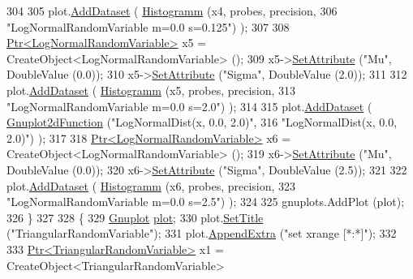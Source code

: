 \begin{DoxyCode}
304 
305     plot.\hyperlink{classns3_1_1Gnuplot_a306ec724a327cf9ab699700f31fca0a1}{AddDataset} ( \hyperlink{main-random-variable_8cc_a2cfd3837ab3f2e816cf53486d7a186b5}{Histogramm} (x4, probes, precision,
306                                   \textcolor{stringliteral}{"LogNormalRandomVariable m=0.0 s=0.125"}) );
307 
308     \hyperlink{classns3_1_1Ptr}{Ptr<LogNormalRandomVariable>} x5 = CreateObject<LogNormalRandomVariable> ();
309     x5->\hyperlink{classns3_1_1ObjectBase_ac60245d3ea4123bbc9b1d391f1f6592f}{SetAttribute} (\textcolor{stringliteral}{"Mu"}, DoubleValue (0.0));
310     x5->\hyperlink{classns3_1_1ObjectBase_ac60245d3ea4123bbc9b1d391f1f6592f}{SetAttribute} (\textcolor{stringliteral}{"Sigma"}, DoubleValue (2.0));
311 
312     plot.\hyperlink{classns3_1_1Gnuplot_a306ec724a327cf9ab699700f31fca0a1}{AddDataset} ( \hyperlink{main-random-variable_8cc_a2cfd3837ab3f2e816cf53486d7a186b5}{Histogramm} (x5, probes, precision,
313                                   \textcolor{stringliteral}{"LogNormalRandomVariable m=0.0 s=2.0"}) );
314 
315     plot.\hyperlink{classns3_1_1Gnuplot_a306ec724a327cf9ab699700f31fca0a1}{AddDataset} ( \hyperlink{classns3_1_1Gnuplot2dFunction}{Gnuplot2dFunction} (\textcolor{stringliteral}{"LogNormalDist(x, 0.0, 2.0)"},
316                                          \textcolor{stringliteral}{"LogNormalDist(x, 0.0, 2.0)"}) );
317 
318     \hyperlink{classns3_1_1Ptr}{Ptr<LogNormalRandomVariable>} x6 = CreateObject<LogNormalRandomVariable> ();
319     x6->\hyperlink{classns3_1_1ObjectBase_ac60245d3ea4123bbc9b1d391f1f6592f}{SetAttribute} (\textcolor{stringliteral}{"Mu"}, DoubleValue (0.0));
320     x6->\hyperlink{classns3_1_1ObjectBase_ac60245d3ea4123bbc9b1d391f1f6592f}{SetAttribute} (\textcolor{stringliteral}{"Sigma"}, DoubleValue (2.5));
321 
322     plot.\hyperlink{classns3_1_1Gnuplot_a306ec724a327cf9ab699700f31fca0a1}{AddDataset} ( \hyperlink{main-random-variable_8cc_a2cfd3837ab3f2e816cf53486d7a186b5}{Histogramm} (x6, probes, precision,
323                                   \textcolor{stringliteral}{"LogNormalRandomVariable m=0.0 s=2.5"}) );
324 
325     gnuplots.AddPlot (plot);
326   \}
327 
328   \{
329     \hyperlink{classns3_1_1Gnuplot}{Gnuplot} \hyperlink{lte__amc_8m_a5942306abe9f005572e4344e3cdef528}{plot};
330     plot.\hyperlink{classns3_1_1Gnuplot_ac01f15633d49f0239f8a45293a1e04f0}{SetTitle} (\textcolor{stringliteral}{"TriangularRandomVariable"});
331     plot.\hyperlink{classns3_1_1Gnuplot_a649a3041b9d0ea21a212b5ad9b28ecbf}{AppendExtra} (\textcolor{stringliteral}{"set xrange [*:*]"});
332 
333     \hyperlink{classns3_1_1Ptr}{Ptr<TriangularRandomVariable>} x1 = CreateObject<TriangularRandomVariable> 

\end{DoxyCode}
